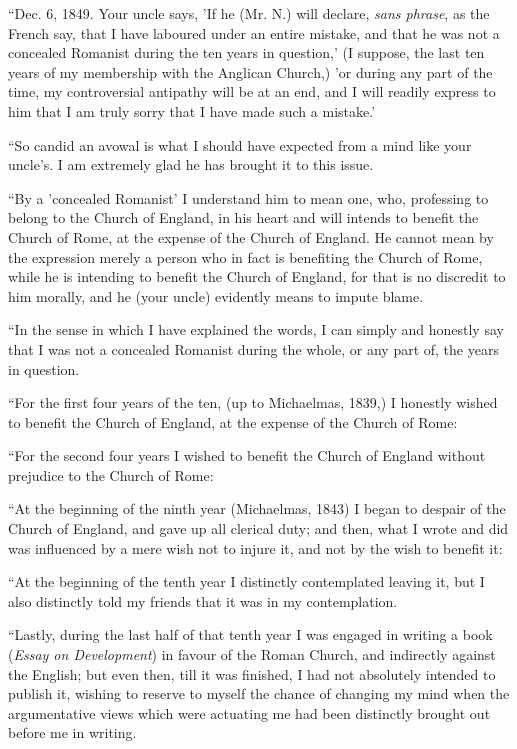 ``Dec. 6, 1849. Your uncle says, 'If he (Mr. N.) will declare, \emph{sans phrase}, as the French say, that I have laboured under an entire
mistake, and that he was not a concealed Romanist during the ten years
in question,' (I suppose, the last ten years of my membership with the
Anglican Church,) 'or during any part of the time, my controversial
antipathy will be at an end, and I will readily express to him that I am
truly sorry that I have made such a mistake.'

``So candid an avowal is what I should have expected from a mind
like your uncle's. I am extremely glad he has brought it to this issue.

``By a 'concealed Romanist' I understand him to mean one, who,
professing to belong to the Church of England, in his heart and will
intends to benefit the Church of Rome, at the expense of the Church of
England. He cannot mean by the expression merely a person who in fact is
benefiting the Church of Rome, while he is intending to benefit the
Church of England, for that is no discredit to him morally, and he (your
uncle) evidently means to impute blame.

``In the sense in which I have explained the words, I can simply
and honestly say that I was not a concealed Romanist during the whole,
or any part of, the years in question.

``For the first four years of the ten, (up to Michaelmas, 1839,)
I honestly wished to benefit the Church of England, at the expense of
the Church of Rome:

``For the second four years I wished to benefit the Church of
England without prejudice to the Church of Rome:

``At the beginning of the ninth year (Michaelmas, 1843) I began
to despair of the Church of England, and gave up all clerical duty; and
then, what I wrote and did was influenced by a mere wish not to injure
it, and not by the wish to benefit it:

``At the beginning of the tenth year I distinctly contemplated
leaving it, but I also distinctly told my friends that it was in my
contemplation.

``Lastly, during the last half of that tenth year I was engaged
in writing a book (\emph{Essay on Development}) in favour of the Roman Church,
and indirectly against the English; but even then, till it was finished,
I had not absolutely intended to publish it, wishing to reserve to
myself the chance of changing my mind when the argumentative views which
were actuating me had been distinctly brought out before me in writing.

